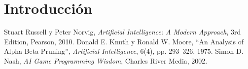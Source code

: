 \documentclass[a4paper,12pt,openany]{book}
\begin{document}
\newpage

%

\renewcommand{\contentsname}{\centering Índice General}
\tableofcontents
\newpage

\chapter*{Introducción}



% 

% 

% 

% 

\newpage

\begin{thebibliography}{99}
     Stuart Russell y Peter Norvig, \textit{Artificial Intelligence: A Modern Approach}, 3rd Edition, Pearson, 2010.
     Donald E. Knuth y Ronald W. Moore, ``An Analysis of Alpha-Beta Pruning'', \textit{Artificial Intelligence}, 6(4), pp. 293–326, 1975.
     Simon D. Nash, \textit{AI Game Programming Wisdom}, Charles River Media, 2002.
    \end{thebibliography}
    
\end{document}
